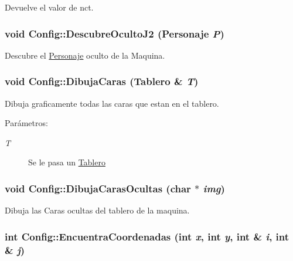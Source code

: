 Devuelve el valor de nct. 

\hypertarget{class_config_bef122e837338a9bcc4c2b0a95866d31}{
\subsubsection[{DescubreOcultoJ2}]{\setlength{\rightskip}{0pt plus 5cm}void Config::DescubreOcultoJ2 ({\bf Personaje} {\em P})}}
\label{class_config_bef122e837338a9bcc4c2b0a95866d31}


Descubre el \hyperlink{class_personaje}{Personaje} oculto de la Maquina. 

\hypertarget{class_config_5861894c33eea7cec9523494912a295a}{
\subsubsection[{DibujaCaras}]{\setlength{\rightskip}{0pt plus 5cm}void Config::DibujaCaras ({\bf Tablero} \& {\em T})}}
\label{class_config_5861894c33eea7cec9523494912a295a}


Dibuja graficamente todas las caras que estan en el tablero. 

\begin{Desc}
\item[Parámetros:]
\begin{description}
\item[{\em T}]Se le pasa un \hyperlink{class_tablero}{Tablero} \end{description}
\end{Desc}
\hypertarget{class_config_9f697dc06ed8ea10eb674ffa747bbdab}{
\subsubsection[{DibujaCarasOcultas}]{\setlength{\rightskip}{0pt plus 5cm}void Config::DibujaCarasOcultas (char $\ast$ {\em img})}}
\label{class_config_9f697dc06ed8ea10eb674ffa747bbdab}


Dibuja las Caras ocultas del tablero de la maquina. 

\hypertarget{class_config_d2717716bb3e5cbca52b4fb906cfc2b0}{
\subsubsection[{EncuentraCoordenadas}]{\setlength{\rightskip}{0pt plus 5cm}int Config::EncuentraCoordenadas (int {\em x}, \/  int {\em y}, \/  int \& {\em i}, \/  int \& {\em j})}}
\label{class_config_d2717716bb3e5cbca52b4fb906cfc2b0}


